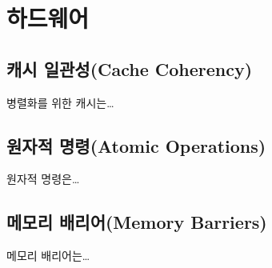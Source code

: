 \newpage
\section{하드웨어}
\label{sec:hwrelated}

\subsection{캐시 일관성(Cache Coherency)}



병렬화를 위한 캐시는\ldots 




\subsection{원자적 명령(Atomic Operations)}

원자적 명령은\ldots



\subsection{메모리 배리어(Memory Barriers)}

메모리 배리어는\ldots




